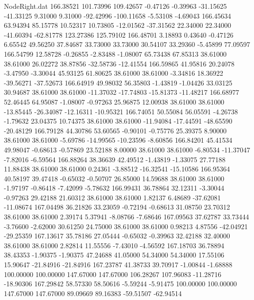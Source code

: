 \begin{filecontents}{NodeRight.dat}
 166.38521  101.73996  109.42657    -0.47126   -0.39963  -31.15625  -41.33125    9.31000    9.31000  -92.42996 -100.11658   -5.53108   -4.69043
 166.45634   63.94394   85.15778    10.52317   10.73805  -12.01562  -37.31562   22.34000   22.34000  -41.60394  -62.81778  123.27386  125.79102
 166.48701    3.18893    0.43640    -0.47126    6.65542   49.56250   37.84687   33.73000   33.73000   30.54107   33.29360   -5.45899   77.09597
 166.54799   12.58728   -0.26855    -2.83488   -1.08007   65.73438   67.85313   38.61000   38.61000   26.02272   38.87856  -32.58736  -12.41554
 166.59865   41.95816   20.24078    -3.47950   -3.30044   45.93125   61.80625   38.61000   38.61000   -3.34816   18.36922  -39.56271  -37.52673
 166.64919   49.98032   56.35803    -1.43819   -1.04426   33.03125   30.94687   38.61000   38.61000  -11.37032  -17.74803  -15.81373  -11.48217
 166.68977   52.46445   64.95087    -1.08007   -0.97263   25.96875   12.00938   38.61000   38.61000  -13.85445  -26.34087  -12.16311  -10.95321
 166.74051   50.55084   56.05591    -4.26738   -1.79632   23.04375   10.74375   38.61000   38.61000  -11.94084  -17.44591  -48.65590  -20.48129
 166.79128   44.30786   53.60565    -0.90101   -0.75776   25.39375    8.90000   38.61000   38.61000   -5.69786  -14.99565  -10.23596   -8.60856
 166.84201   45.41534   49.98047    -0.68613   -0.57869   23.52188    8.00000   38.61000   38.61000   -6.80534  -11.37047   -7.82016   -6.59564
 166.88264   38.36639   42.49512    -1.43819   -1.33075   27.77188   11.88438   38.61000   38.61000    0.24361   -3.88512  -16.32541  -15.10586
 166.95364   40.58197   39.47418    -0.65032   -0.50707   26.85000   14.59688   38.61000   38.61000   -1.97197   -0.86418   -7.42099   -5.78632
 166.99431   36.78864   32.12311    -3.30044   -0.97263   29.42188   21.60312   38.61000   38.61000    1.82137    6.48689  -37.62081  -11.08674
 167.04498   36.21826   33.23059    -0.72194   -0.68613   31.08750   23.70312   38.61000   38.61000    2.39174    5.37941   -8.08766   -7.68646
 167.09563   37.62787   33.73444    -3.76600   -2.62000   30.61250   24.75000   38.61000   38.61000    0.98213    4.87556  -42.04921  -29.25359
 167.13617   35.78186   27.05444    -0.65032   -0.39963   32.42188   32.40000   38.61000   38.61000    2.82814   11.55556   -7.43010   -4.56592
 167.18703   36.78894   38.43353    -1.90375   -1.90375   47.24688   41.05000   54.34000   54.34000   17.55106   15.90647  -21.84916  -21.84916
 167.23787   41.38733   39.70917    -1.00844   -1.68888  100.00000  100.00000  147.67000  147.67000  106.28267  107.96083  -11.28716  -18.90306
 167.29842   58.57330   58.50616    -5.59244   -5.91475  100.00000  100.00000  147.67000  147.67000   89.09669   89.16383  -59.51507  -62.94514

\end{filecontents}
